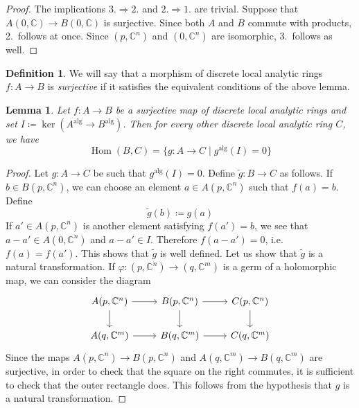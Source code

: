 \documentclass[12pt,a4paper,reqno]{amsart}
\theoremstyle{plain}
\newtheorem{lem}[thm]{Lemma}
\theoremstyle{definition}
\newtheorem{defin}[thm]{Definition}
\theoremstyle{remark}
\numberwithin{equation}{section}
\begin{document}
\begin{proof}
	The implications $3. \Rightarrow 2.$ and $2. \Rightarrow 1.$ are trivial.
	Suppose that $A(0, \mathbb C) \to B(0, \mathbb C)$ is surjective.
	Since both $A$ and $B$ commute with products, 2.\ follows at once.
	Since $(p, \mathbb C^n)$ and $(0, \mathbb C^n)$ are isomorphic, 3.\ follows as well.
\end{proof}

\begin{defin}
	We will say that a morphism of discrete local analytic rings $f \colon A \to B$ is \emph{surjective} if it satisfies the equivalent conditions of the above lemma.
\end{defin}

\begin{lem}
	Let $f \colon A \to B$ be a surjective map of discrete local analytic rings and set $I \coloneqq \ker(A{^\mathrm{alg}} \to B{^\mathrm{alg}})$.
	Then for every other discrete local analytic ring $C$, we have
	\[ \operatorname{Hom}(B,C) = \{g \colon A \to C \mid g{^\mathrm{alg}}(I) = 0\} \]
\end{lem}

\begin{proof}
	Let $g \colon A \to C$ be such that $g{^\mathrm{alg}}(I) = 0$.
	Define $\widetilde{g} \colon B \to C$ as follows.
	If $b \in B(p, \mathbb C^n)$, we can choose an element $a \in A(p, \mathbb C^n)$ such that $f(a) = b$.
	Define
	\[ \widetilde{g}(b) \coloneqq g(a) \]
	If $a' \in A(p, \mathbb C^n)$ is another element satisfying $f(a') = b$, we see that $a - a' \in A(0, \mathbb C^n)$ and $a - a' \in I$.
	Therefore $f(a - a') = 0$, i.e.\ $f(a) = f(a')$.
	This shows that $\widetilde{g}$ is well defined.
	Let us show that $\widetilde{g}$ is a natural transformation.
	If $\varphi \colon (p, \mathbb C^n) \to (q, \mathbb C^m)$ is a germ of a holomorphic map, we can consider the diagram
	\[ \begin{tikzcd}
	A(p, \mathbb C^n) \arrow{d} \arrow{r} & B(p, \mathbb C^n) \arrow{d} \arrow{r} & C(p, \mathbb C^n) \arrow{d} \\
	A(q, \mathbb C^m) \arrow{r} & B(q, \mathbb C^m) \arrow{r} & C(q, \mathbb C^m)
	\end{tikzcd} \]
	Since the maps $A(p, \mathbb C^n) \to B(p, \mathbb C^n)$ and $A(q, \mathbb C^m) \to B(q, \mathbb C^m)$ are surjective, in order to check that the square on the right commutes, it is sufficient to check that the outer rectangle does.
	This follows from the hypothesis that $g$ is a natural transformation.
\end{proof}
\end{document}

